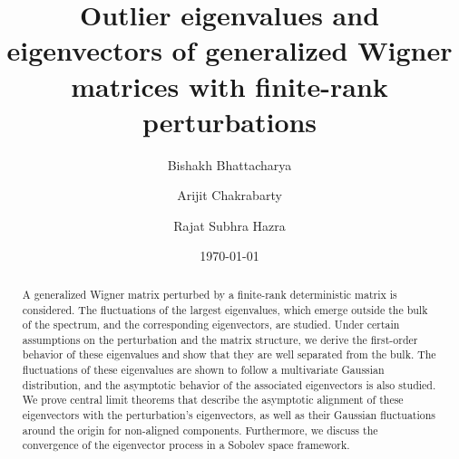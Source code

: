 \documentclass[11pt, reqno]{amsart}
\numberwithin{equation}{section}
\begin{document}
\title[Outliers of Wigner Matrix]{Outlier eigenvalues and eigenvectors of generalized Wigner matrices with finite-rank perturbations}

\author[B. Bhattacharya]{Bishakh Bhattacharya} 
\address{Indian Statistical Institute, 203, B.T. Road, Kolkata.} 
\author[A. Chakrabarty]{Arijit Chakrabarty}
\address{Indian Statistical Institute, 203, B.T. Road, Kolkata.}
\author[R. S. Hazra]{Rajat Subhra Hazra}
\address{Mathematical Institute, Leiden University, Einsteinweg 55, 2333 CC Leiden, The Netherlands}




\date{\today}







\begin{abstract}
A generalized Wigner matrix perturbed by a finite-rank deterministic matrix is considered. The fluctuations of the largest eigenvalues, which emerge outside the bulk of the spectrum, and the corresponding eigenvectors, are studied. Under certain assumptions on the perturbation and the matrix structure, we derive the first-order behavior of these eigenvalues and show that they are well separated from the bulk. The fluctuations of these eigenvalues are shown to follow a multivariate Gaussian distribution, and the asymptotic behavior of the associated eigenvectors is also studied. We prove central limit theorems that describe the asymptotic alignment of these eigenvectors with the perturbation's eigenvectors, as well as their Gaussian fluctuations around the origin for non-aligned components. Furthermore, we discuss the convergence of the eigenvector process in a Sobolev space framework. 
\end{abstract}


\maketitle

\tableofcontents
\end{document}

